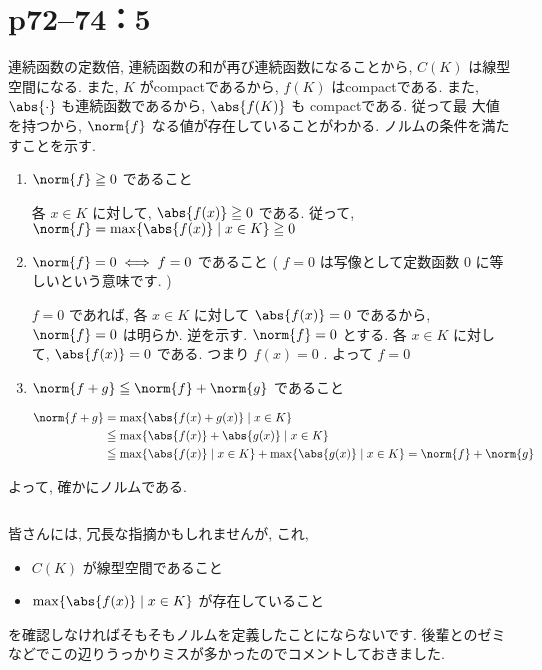 \section*{p72--74：5}
\begin{tproof}
    連続函数の定数倍, 連続函数の和が再び連続函数になることから, $C ( K )$ は線型空間になる. また, $K$ がcompactであるから, $f ( K )$ はcompactである. また, $\abs{ \cdot }$ も連続函数であるから, $\abs{ f ( K ) }$ も compactである. 従って最
    大値を持つから, $\norm{ f }$ なる値が存在していることがわかる. ノルムの条件を満たすことを示す.
    \begin{enumerate}
        \item $\norm{ f } \geq 0$ であること

              \zw 各 $x \in K$ に対して, $\abs{f ( x ) } \geq 0$ である. 従って, $\norm{ f } = \max \{ \abs{ f ( x )} \mid x \in K \} \geq 0$

        \item $\norm{ f } = 0 \iff  f = 0$ であること ( $f = 0$ は写像として定数函数 $0$ に等しいという意味です. )

              $f = 0$ であれば, 各 $x \in K$ に対して $\abs{ f ( x ) } = 0$ であるから, $\norm{ f } = 0$ は明らか. 逆を示す. $\norm{ f } = 0$ とする. 各 $x \in K$ に対して, $\abs{ f ( x ) } = 0$ である. つまり $f ( x ) = 0$ . よって $f = 0$

        \item $\norm{ f + g } \leq \norm{ f } + \norm{ g }$ であること

              \begin{align*}
                  \norm{ f + g } & =  \max \{ \abs{ f ( x ) + g ( x )} \mid x \in K \}                                                                   \\
                                 & \leq  \max \{ \abs{ f ( x ) } + \abs{ g ( x ) } \mid x \in K \}                                                       \\
                                 & \leqq   \max \{ \abs{ f ( x ) }  \mid x \in K \} + \max \{ \abs{ g ( x ) }  \mid x \in K \} = \norm{ f } + \norm{ g }
              \end{align*}
    \end{enumerate}
    よって, 確かにノルムである.
\end{tproof}

\begin{column}
    皆さんには, 冗長な指摘かもしれませんが, これ,
    \begin{itemize}
        \item $C ( K )$ が線型空間であること
        \item $\max \{ \abs{ f ( x )} \mid x \in K \}$ が存在していること
    \end{itemize}
    を確認しなければそもそもノルムを定義したことにならないです. 後輩とのゼミなどでこの辺りうっかりミスが多かったのでコメントしておきました.
\end{column}

